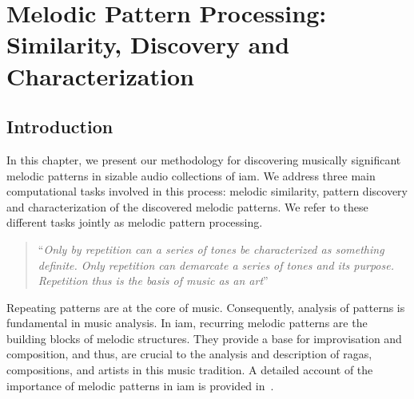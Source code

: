 
\chapter{Melodic Pattern Processing: Similarity, Discovery and Characterization}
\label{chap:melodic_pattern_processing}

\section{Introduction}
\label{sec:patterns_introduction}

In this chapter, we present our methodology for discovering musically significant melodic patterns in sizable audio collections of \gls{iam}. We address three main computational tasks involved in this process: melodic similarity, pattern discovery and characterization of the discovered melodic patterns. We refer to these different tasks jointly as melodic pattern processing.

\blockcquote[]{schenker1980harmony}{``\textit{Only by repetition can a series of tones be characterized as something definite. Only repetition can demarcate a series of tones and its purpose. Repetition thus is the basis of music as an art}''}

Repeating patterns are at the core of music. Consequently, analysis of patterns is fundamental in music analysis. In \gls{iam}, recurring melodic patterns are the building blocks of melodic structures. They provide a base for improvisation and composition, and thus, are crucial to the analysis and description of \glspl{raga}, compositions, and artists in this music tradition. A detailed account of the importance of melodic patterns in \gls{iam} is provided in~. 



